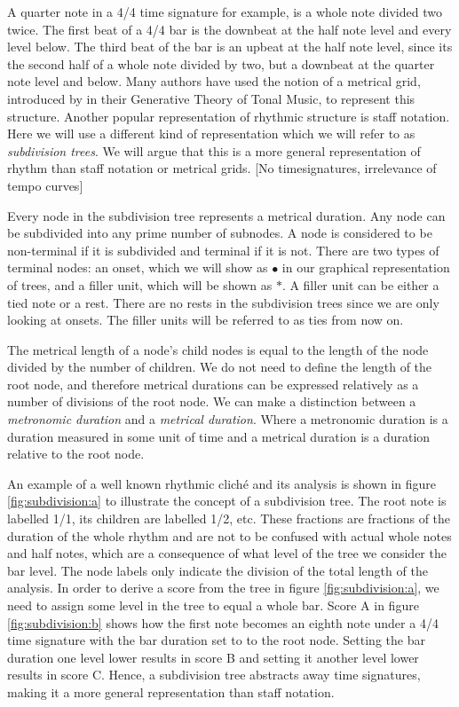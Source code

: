 A quarter note in a 4/4 time signature for example, is a whole note divided two twice. The first beat of a 4/4 bar is the downbeat at the half note level and every level below. The third beat of the bar is an upbeat at the half note level, since its the second half of a whole note divided by two, but a downbeat at the quarter note level and below. Many authors have used the notion of a metrical grid, introduced by \citet{lerdahl1983generative} in their Generative Theory of Tonal Music, to represent this structure. Another popular representation of rhythmic structure is staff notation. Here we will use a different kind of representation which we will refer to as \textit{subdivision trees}. We will argue that this is a more general representation of rhythm than staff notation or metrical grids. [No timesignatures, irrelevance of tempo curves]

Every node in the subdivision tree represents a metrical duration. Any node can be subdivided into any prime number of subnodes. A node is considered to be non-terminal if it is subdivided and terminal if it is not. There are two types of terminal nodes: an onset, which we will show as $\bullet$ in our graphical representation of trees, and a filler unit, which will be shown as $*$. A filler unit can be either a tied note or a rest. There are no rests in the subdivision trees since we are only looking at onsets. The filler units will be referred to as ties from now on.

The metrical length of a node's child nodes is equal to the length of the node divided by the number of children. We do not need to define the length of the root node, and therefore metrical durations can be expressed relatively as a number of divisions of the root node. We can make a distinction between a \textit{metronomic duration} and a \textit{metrical duration}. Where a metronomic duration is a duration measured in some unit of time and a metrical duration is a duration relative to the root node. 

An example of a well known rhythmic clich\'e and its analysis is shown in figure \ref{fig:subdivision:a} to illustrate the concept of a subdivision tree. The root note is labelled 1/1,  its children are labelled 1/2, etc. These fractions are fractions of the duration of the whole rhythm and are not to be confused with actual whole notes and half notes, which are a consequence of what level of the tree we consider the bar level. The node labels only indicate the division of the total length of the analysis. In order to derive a score from the tree in figure \ref{fig:subdivision:a}, we need to assign some level in the tree to equal a whole bar. Score A in figure \ref{fig:subdivision:b} shows how the first note becomes an eighth note under a 4/4 time signature with the bar duration set to to the root node. Setting the bar duration one level lower results in score B and setting it another level lower results in score C. Hence, a subdivision tree abstracts away time signatures, making it a more general representation than staff notation.

